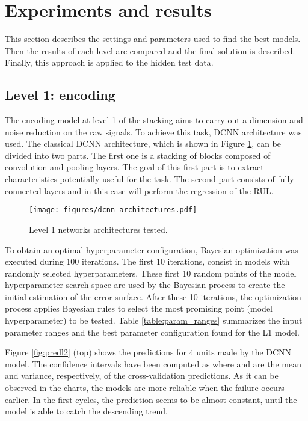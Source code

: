 \documentclass[PHM, 2021]{PHMSociety}
\begin{document}
\section{Experiments and results}

This section describes the settings and parameters used to find the best models. Then the results of each level are compared and the final solution is described. Finally, this approach is applied to the hidden test data.

\subsection{Level 1: encoding}

The encoding model at level 1 of the stacking aims to carry out a dimension and noise reduction on the raw signals. To achieve this task, DCNN architecture was used. The classical DCNN architecture, which is shown in Figure \ref{fig:architectures}, can be divided into two parts. The first one is a stacking of  blocks composed of convolution and pooling layers. The goal of this first part is to extract characteristics potentially useful for the task. The second part consists of fully connected layers and in this case will perform the regression of the RUL.

\begin{figure}[t]
\centering
\texttt{[image: figures/dcnn\_architectures.pdf]}
\caption{Level 1 networks architectures tested.}
\label{fig:architectures}
\end{figure}








To obtain an optimal hyperparameter configuration, Bayesian optimization was executed during 100 iterations. The first 10 iterations, consist in models with randomly selected hyperparameters. These first 10 random points of the model hyperparameter search space are used by the Bayesian process to create the initial estimation of the error surface. After these 10 iterations, the optimization process applies Bayesian rules to select the most promising point (model hyperparameter) to be tested. Table \ref{table:param_ranges} summarizes the input parameter ranges and the best parameter configuration found for the  L1 model.


Figure \ref{fig:predl2} (top) shows the predictions for 4 units made by the DCNN  model. The confidence intervals have been computed as  where  and  are the mean and variance, respectively, of the cross-validation predictions. As it can be observed in the charts, the models are more reliable when the failure occurs earlier. In the first cycles, the prediction seems to be almost constant, until the model is able to catch the descending trend. 
\end{document}
